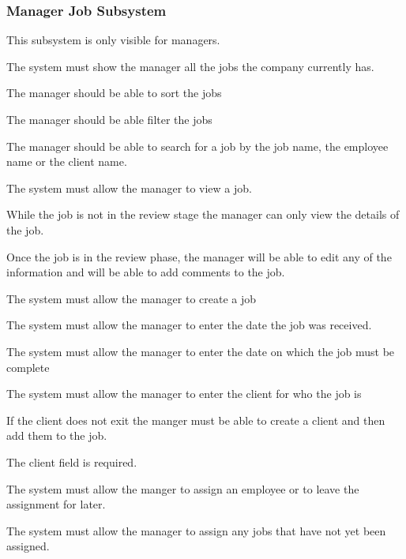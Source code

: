 \documentclass{article}
\begin{document}
	\subsubsection*{Manager Job Subsystem}	
	\begin{list}{R.}{}
		\item This subsystem is only visible for managers.
		\item The system must show the manager all the jobs the company currently has. 
		\begin{list}{R.}{}
			\item The manager should be able to sort the jobs
			\item The manager should be able filter the jobs 
			\item The manager should be able to search for a job by the job name, the employee name or the client name. 
		\end{list}
		\item The system must allow the manager to view a job.
		\begin{list}{R.}{}
			\item While the job is not in the review stage the manager can only view the details of the job.
			\item Once the job is in the review phase, the manager will be able to edit any of the information and will be able to add comments to the job. 
		\end{list}
		\item The system must allow the manager to create a job
		\begin{list}{R.}{}
			\item The system must allow the manager to enter the date the job was received.
			\item The system must allow the manager to enter the date on which the job must be complete 
			\item The system must allow the manager to enter the client for who the job is
			\begin{list}{R..}{}
				\item If the client does not exit the manger must be able to create a client and then add them to the job.
				\item The client field is required.
			\end{list}
			\item The system must allow the manger to assign an employee or to leave the assignment for later.
		\end{list}
		\item The system must allow the manager to assign any jobs that have not yet been assigned.
		
	\end{list}
\end{document}

